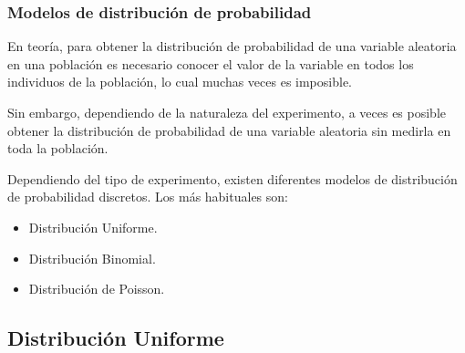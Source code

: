 \begin{frame}
\frametitle{Modelos de distribución de probabilidad}
En teoría, para obtener la distribución de probabilidad de una variable aleatoria en una población es necesario conocer el valor de la
variable en todos los individuos de la población, lo cual muchas veces es imposible.

Sin embargo, dependiendo de la naturaleza del experimento, a veces es posible obtener la distribución de probabilidad de una variable
aleatoria sin medirla en toda la población.

Dependiendo del tipo de experimento, existen diferentes modelos de distribución de probabilidad discretos. Los más habituales son:
\begin{itemize}
\item Distribución Uniforme.
\item Distribución Binomial.
\item Distribución de Poisson.
\end{itemize}

\end{frame}


\subsection{Distribución Uniforme}

